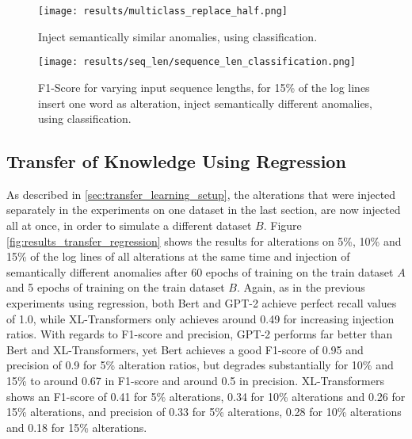 \begin{figure}[H]
  \centering
  \captionsetup{justification=centering}
  \texttt{[image: results/multiclass\_replace\_half.png]}\\
  \caption{Inject semantically similar anomalies, using classification.}
  \label{fig:replace_words_classification}
\end{figure}


\begin{figure}[H]
\centering
  \captionsetup{justification=centering}
  \texttt{[image: results/seq\_len/sequence\_len\_classification.png]}\\
  \caption{F1-Score for varying input sequence lengths, for 15\% of the log lines insert one word as alteration, inject semantically different anomalies, using classification.}
  \label{fig:seq_len_classification}
\end{figure}





\subsection{Transfer of Knowledge Using Regression \label{sec:results-regression-transfer}}

As described in \ref{sec:transfer_learning_setup}, the alterations that were injected separately in the experiments on one dataset in the last section, are now injected all at once, in order to simulate a different dataset $B$. Figure \ref{fig:results_transfer_regression} shows the results for alterations on 5\%, 10\% and 15\% of the log lines of all alterations at the same time and injection of semantically different anomalies after 60 epochs of training on the train dataset $A$ and 5 epochs of training on the train dataset $B$. 
Again, as in the previous experiments using regression, both Bert and GPT-2 achieve perfect recall values of 1.0, while XL-Transformers only achieves around 0.49 for increasing injection ratios. With regards to F1-score and precision, GPT-2 performs far better than Bert and XL-Transformers, yet Bert achieves a good F1-score of 0.95 and precision of 0.9 for 5\% alteration ratios, but degrades substantially for 10\% and 15\% to around 0.67 in F1-score and around 0.5 in precision. XL-Transformers shows an F1-score of 0.41 for 5\% alterations, 0.34 for 10\% alterations and 0.26 for 15\% alterations, and precision of 0.33 for 5\% alterations, 0.28 for 10\% alterations and 0.18 for 15\% alterations.

